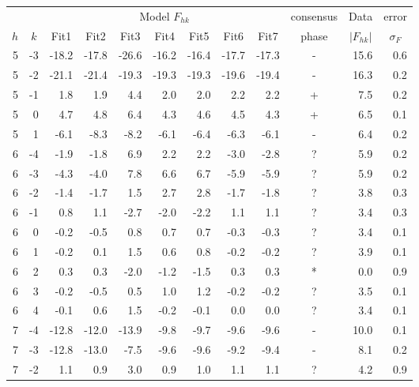 \begin{table}[htbp]
\centering
\begin{tabular}{rrrrrrrrrcrr}
\hline
& & \multicolumn{7}{c}{Model $F_{hk}$} & consensus & \multicolumn{1}{c}{Data} & \multicolumn{1}{c}{error} \\
\cline{3-9}
\multicolumn{1}{c}{$h$} & \multicolumn{1}{c}{$k$} & \multicolumn{1}{c}{Fit1} & \multicolumn{1}{c}{Fit2} & \multicolumn{1}{c}{Fit3} & \multicolumn{1}{c}{Fit4} & \multicolumn{1}{c}{Fit5} & \multicolumn{1}{c}{Fit6} & \multicolumn{1}{c}{Fit7} & phase & \multicolumn{1}{c}{$\left|F_{hk}\right|$} & \multicolumn{1}{c}{$\sigma_F$} \\ 
\hline
5 & -3 & -18.2 & -17.8 & -26.6 & -16.2 & -16.4 & -17.7 & -17.3 & - & 15.6 & 0.6 \\ 
5 & -2 & -21.1 & -21.4 & -19.3 & -19.3 & -19.3 & -19.6 & -19.4 & - & 16.3 & 0.2 \\ 
5 & -1 & 1.8 & 1.9 & 4.4 & 2.0 & 2.0 & 2.2 & 2.2 & + & 7.5 & 0.2 \\ 
5 & 0 & 4.7 & 4.8 & 6.4 & 4.3 & 4.6 & 4.5 & 4.3 & + & 6.5 & 0.1 \\ 
5 & 1 & -6.1 & -8.3 & -8.2 & -6.1 & -6.4 & -6.3 & -6.1 & - & 6.4 & 0.2 \\ 
6 & -4 & -1.9 & -1.8 & 6.9 & 2.2 & 2.2 & -3.0 & -2.8 & ? & 5.9 & 0.2 \\ 
6 & -3 & -4.3 & -4.0 & 7.8 & 6.6 & 6.7 & -5.9 & -5.9 & ? & 5.9 & 0.2 \\ 
6 & -2 & -1.4 & -1.7 & 1.5 & 2.7 & 2.8 & -1.7 & -1.8 & ? & 3.8 & 0.3 \\ 
6 & -1 & 0.8 & 1.1 & -2.7 & -2.0 & -2.2 & 1.1 & 1.1 & ? & 3.4 & 0.3 \\ 
6 & 0 & -0.2 & -0.5 & 0.8 & 0.7 & 0.7 & -0.3 & -0.3 & ? & 3.4 & 0.1 \\ 
6 & 1 & -0.2 & 0.1 & 1.5 & 0.6 & 0.8 & -0.2 & -0.2 & ? & 3.9 & 0.1 \\ 
6 & 2 & 0.3 & 0.3 & -2.0 & -1.2 & -1.5 & 0.3 & 0.3 & * & 0.0 & 0.9 \\ 
6 & 3 & -0.2 & -0.5 & 0.5 & 1.0 & 1.2 & -0.2 & -0.2 & ? & 3.5 & 0.1 \\ 
6 & 4 & -0.1 & 0.6 & 1.5 & -0.2 & -0.1 & 0.0 & 0.0 & ? & 3.4 & 0.1 \\ 
7 & -4 & -12.8 & -12.0 & -13.9 & -9.8 & -9.7 & -9.6 & -9.6 & - & 10.0 & 0.1 \\ 
7 & -3 & -12.8 & -13.0 & -7.5 & -9.6 & -9.6 & -9.2 & -9.4 & - & 8.1 & 0.2 \\ 
7 & -2 & 1.1 & 0.9 & 3.0 & 0.9 & 1.0 & 1.1 & 1.1 & ? & 4.2 & 0.9 \\ 

\end{tabular}
\end{table}
